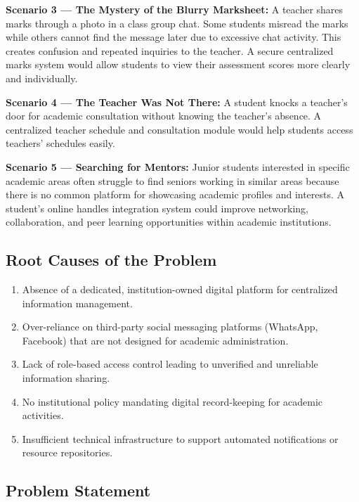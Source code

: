 \documentclass[12pt,a4paper]{article}
\begin{document}
\medskip
\textbf{Scenario 3 --- The Mystery of the Blurry Marksheet:} A teacher shares marks through a photo in a class group chat. Some students misread the marks while others cannot find the message later due to excessive chat activity. This creates confusion and repeated inquiries to the teacher. A secure centralized marks system would allow students to view their assessment scores more clearly and individually.

\medskip
\textbf{Scenario 4 --- The Teacher Was Not There:} A student knocks a teacher's door for academic consultation without knowing the teacher's absence. A centralized teacher schedule and consultation module would help students access teachers' schedules easily.

\medskip
\textbf{Scenario 5 --- Searching for Mentors:} Junior students interested in specific academic areas often struggle to find seniors working in similar areas because there is no common platform for showcasing academic profiles and interests. A student's online handles integration system could improve networking, collaboration, and peer learning opportunities within academic institutions.

\subsection{Root Causes of the Problem}

\begin{enumerate}[leftmargin=*, label=\textbf{\arabic*.}]
  \item Absence of a dedicated, institution-owned digital platform for centralized information management.
  \item Over-reliance on third-party social messaging platforms (WhatsApp, Facebook) that are not designed for academic administration.
  \item Lack of role-based access control leading to unverified and unreliable information sharing.
  \item No institutional policy mandating digital record-keeping for academic activities.
  \item Insufficient technical infrastructure to support automated notifications or resource repositories.
\end{enumerate}

\subsection{Problem Statement}
\end{document}
